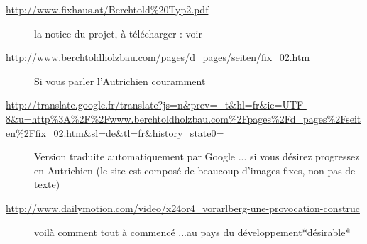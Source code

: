 \documentclass[a4paper,12pt,french]{sphinxmanual}
\begin{document}

\begin{description}
\item[{\url{http://www.fixhaus.at/Berchtold\%20Typ2.pdf}}] \leavevmode
la notice du projet, à télécharger : voir {\hyperref[init_su+acad/demarrage:demarrage\string-init\string-su\string-acad]{}}

\item[{\url{http://www.berchtoldholzbau.com/pages/d\_pages/seiten/fix\_02.htm}}] \leavevmode
Si vous parler l'Autrichien couramment

\item[{\url{http://translate.google.fr/translate?js=n\&prev=\_t\&hl=fr\&ie=UTF-8\&u=http\%3A\%2F\%2Fwww.berchtoldholzbau.com\%2Fpages\%2Fd\_pages\%2Fseiten\%2Ffix\_02.htm\&sl=de\&tl=fr\&history\_state0=}}] \leavevmode
Version traduite automatiquement par Google ... si vous désirez progressez en Autrichien (le site est composé de beaucoup d'images fixes, non pas de texte)

\item[{\url{http://www.dailymotion.com/video/x24or4\_vorarlberg-une-provocation-construc}}] \leavevmode
voilà comment tout à commencé ...au pays du développement*désirable*

\end{description}
\end{document}
